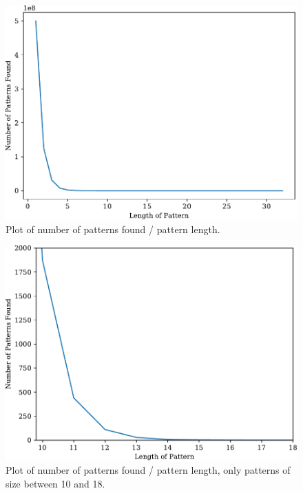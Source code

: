 \documentclass[conference,a4paper]{IEEEtran}
\begin{document}
  \begin{figure}[htbp]
    \centering
    \includegraphics[width=0.95\linewidth]{../plots/matches_len.pdf}
    \caption{Plot of number of patterns found / pattern length.}
    \label{fig:matches_len}
  \end{figure}
  \newpage
  \balance
  \begin{figure}[htbp]
    \centering
    \includegraphics[width=0.95\linewidth]{../plots/matches_len2.pdf}
    \caption{Plot of number of patterns found / pattern length, only patterns of size between 10 and 18.}
    \label{fig:matches_len2}
  \end{figure}


% 
% 
\end{document}
